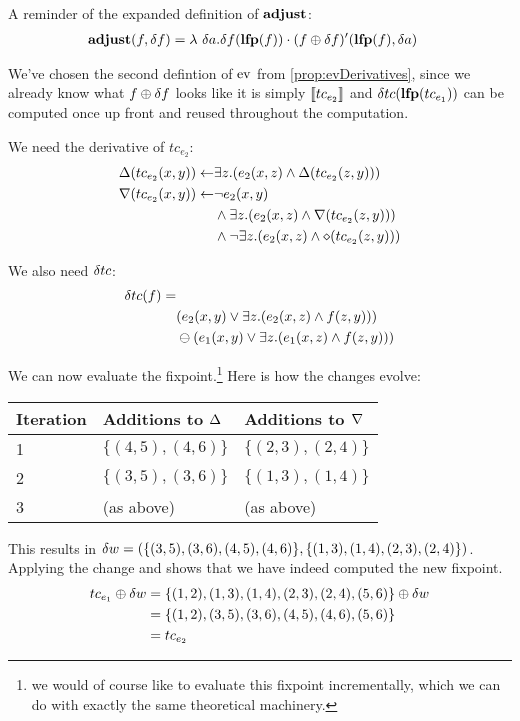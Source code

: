 A reminder of the expanded definition of $\mathbf{adjust}$:
\begin{align*}
  \mathbf{adjust}(f, \delta f) &= \lambda\ \delta a. \delta f(\mathbf{lfp}(f)) \cdot (f \oplus \delta f)'(\mathbf{lfp}(f), \delta a)
\end{align*}

We've chosen the second defintion of $\operatorname{ev}$ from \cref{prop:evDerivatives}, since
we already know what $f \oplus \delta f$ looks like \textemdash{} it is simply
$\llbracket tc_{e_2} \rrbracket$ \textemdash{} and $\delta tc(\mathbf{lfp}(tc_{e_1}))$ can be
computed once up front and reused throughout the computation.

We need the derivative of $tc_{e_2}$:
\begin{align*}
  \Delta(tc_{e_2}(x, y)) \leftarrow & \exists z. (e_2(x,z) \wedge \Delta(tc_{e_2}(z, y)))\\
  \nabla(tc_{e_2}(x, y)) \leftarrow & \neg e_2(x, y)\\
    &\wedge
    \exists z . (e_2(x, z) \wedge \nabla(tc_{e_2}(z, y)))\\
    &\wedge
    \neg \exists z . (e_2(x, z) \wedge \diamond(tc_{e_2}(z,y)))
\end{align*}

We also need $\delta tc$:
\begin{align*}
  \delta tc(f) = &\\
  &(e_2(x,y) \vee \exists z . (e_2(x,z) \wedge f(z,y))) \\
  &\ominus (e_1(x,y) \vee \exists z . (e_1(x,z) \wedge f(z,y)))
\end{align*}

We can now evaluate the fixpoint.\footnote{we would of course like to evaluate this fixpoint
  incrementally, which we can do with exactly the same theoretical machinery.}
Here is how the changes evolve:
\begin{center}
  \begin{tabular} {p{3.5em} p{10em} p{10em}}
    Iteration & Additions to $\Delta$ & Additions to $\nabla$ \\
    \toprule
    1 & $\{ (4,5), (4,6) \}$ & $\{ (2,3), (2,4) \}$\\
    2 & $\{ (3,5), (3,6) \}$ & $\{ (1,3), (1,4) \}$\\
    3 & (as above) & (as above) \\
    \bottomrule
  \end{tabular}
\end{center}
\medskip

This results in $\delta w = (\{ (3,5), (3,6), (4,5), (4,6)\}, \{(1,3), (1,4), (2,3), (2,4)\})$.
Applying the change and shows that we have indeed computed the new fixpoint.
\begin{align*}
  tc_{e_1} \oplus \delta w &= \{(1,2), (1,3), (1,4), (2,3), (2,4), (5,6)\} \oplus \delta w\\
  &= \{(1,2), (3,5), (3,6), (4,5), (4,6), (5,6)\}\\
  &= tc_{e_2}
\end{align*}

